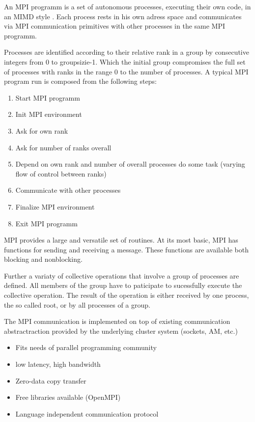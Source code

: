 An MPI programm is a set of autonomous processes, executing their own
code, in an MIMD style \cite{Flynn:1972:COE:1952456.1952459}. Each
process rests in his own adress space and communicates via MPI
communication primitives with other processes in the same MPI
programm. 

Processes are identified according to their relative rank in a group by
consecutive integers from 0 to groupsizie-1. Which the initial group
compromises the full set of processes with ranks in the range 0 to 
the number of processes. A typical MPI program run is composed from
the following steps:

\begin{enumerate}
\item Start MPI programm
\item Init MPI environment
\item Ask for own rank
\item Ask for number of ranks overall
\item Depend on own rank and number of overall processes do some task
  (varying flow of control between ranks)
\item Communicate with other processes
\item Finalize MPI environment
\item Exit MPI programm
\end{enumerate}

MPI provides a large and versatile set of routines. At its most
basic, MPI has functions for sending and receiving a message.
These functions are available both blocking and nonblocking.

Further a variaty of collective operations that involve
a group of processes are defined. All members of the group
have to paticipate to sucessfully execute the collective operation.
The result of the operation is either received by one process,
the so called root, or by all processes of a group.

The MPI communication is implemented on top of existing communication
abstractraction provided by the underlying cluster system (sockets, AM, etc.)

\begin{itemize}
\item Fits needs of parallel programming community
\item low latency, high bandwidth
\item Zero-data copy transfer
\item Free libraries available (OpenMPI)
\item Language independent communication protocol
\end{itemize}

